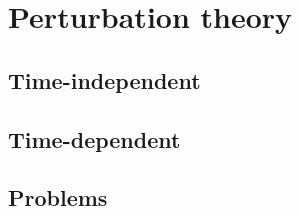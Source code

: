 \section{Perturbation theory}    
	\subsection{Time-independent}
	\subsection{Time-dependent}
	\subsection{Problems}